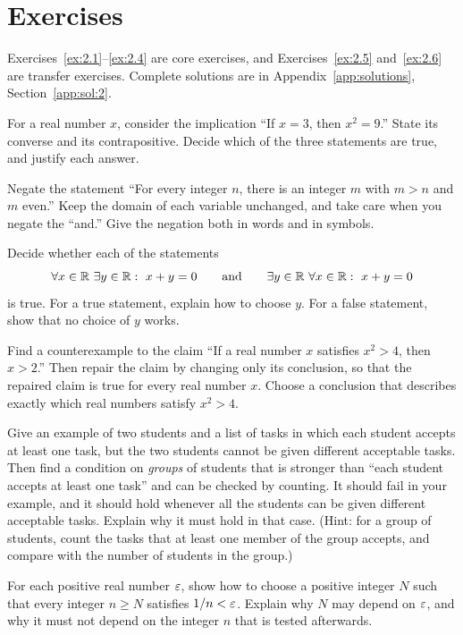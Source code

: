 \section*{Exercises}
Exercises~\ref{ex:2.1}--\ref{ex:2.4} are core exercises, and Exercises~\ref{ex:2.5} and~\ref{ex:2.6} are transfer exercises. Complete solutions are in Appendix~\ref{app:solutions}, Section~\ref{app:sol:2}.
\begin{exercise}\label{ex:2.1}For a real number $x$, consider the implication ``If $x=3$, then $x^2=9$.'' State its converse and its contrapositive. Decide which of the three statements are true, and justify each answer.\end{exercise}
\begin{exercise}\label{ex:2.2}Negate the statement ``For every integer $n$, there is an integer $m$ with $m>n$ and $m$ even.'' Keep the domain of each variable unchanged, and take care when you negate the ``and.'' Give the negation both in words and in symbols.\end{exercise}
\begin{exercise}\label{ex:2.3}Decide whether each of the statements
\[
\forall x\in\mathbb R\ \exists y\in\mathbb R:\ x+y=0
\qquad\text{and}\qquad
\exists y\in\mathbb R\ \forall x\in\mathbb R:\ x+y=0
\]
is true. For a true statement, explain how to choose $y$. For a false statement, show that no choice of $y$ works.\end{exercise}
\begin{exercise}\label{ex:2.4}Find a counterexample to the claim ``If a real number $x$ satisfies $x^2>4$, then $x>2$.'' Then repair the claim by changing only its conclusion, so that the repaired claim is true for every real number $x$. Choose a conclusion that describes exactly which real numbers satisfy $x^2>4$.\end{exercise}
\begin{exercise}\label{ex:2.5}Give an example of two students and a list of tasks in which each student accepts at least one task, but the two students cannot be given different acceptable tasks. Then find a condition on \emph{groups} of students that is stronger than ``each student accepts at least one task'' and can be checked by counting. It should fail in your example, and it should hold whenever all the students can be given different acceptable tasks. Explain why it must hold in that case. (Hint: for a group of students, count the tasks that at least one member of the group accepts, and compare with the number of students in the group.)\end{exercise}
\begin{exercise}\label{ex:2.6}For each positive real number $\varepsilon$, show how to choose a positive integer $N$ such that every integer $n\ge N$ satisfies $1/n<\varepsilon$. Explain why $N$ may depend on $\varepsilon$, and why it must not depend on the integer $n$ that is tested afterwards.\end{exercise}
